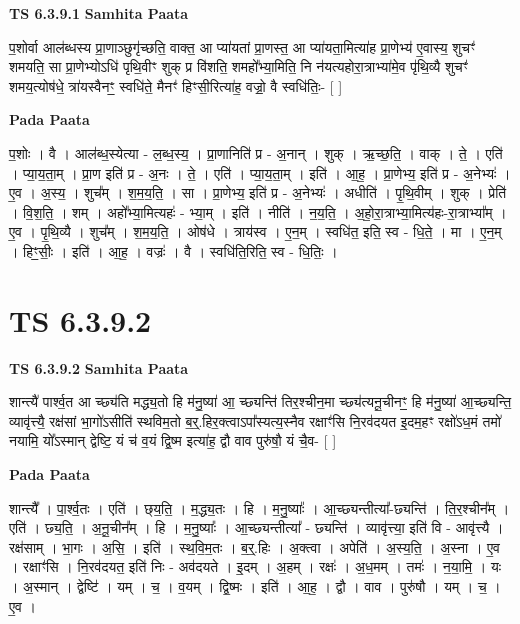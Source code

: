 \documentclass[17pt]{extarticle}
\begin{document}
\textbf{TS 6.3.9.1 } \newline
\textbf{Samhita Paata} \newline

प॒शोर्वा आल॑ब्धस्य प्रा॒णाञ्छुगृ॑च्छति॒ वाक्त॒ आ प्या॑यतां प्रा॒णस्त॒ आ प्या॑यता॒मित्या॑ह प्रा॒णेभ्य॑ ए॒वास्य॒ शुचꣳ॑ शमयति॒ सा प्रा॒णेभ्योऽधि॑ पृथि॒वीꣳ शुक् प्र वि॑शति॒ शमहो᳚भ्या॒मिति॒ नि न॑यत्यहोरा॒त्राभ्या॑मे॒व पृ॑थि॒व्यै शुचꣳ॑ शमय॒त्योष॑धे॒ त्रा॑यस्वैनꣳ॒॒ स्वधि॑ते॒ मैनꣳ॑ हिꣳसी॒रित्या॑ह॒ वज्रो॒॒ वै स्वधि॑तिः॒- [  ] \newline

\textbf{Pada Paata} \newline

प॒शोः । वै । आल॑ब्ध॒स्येत्या - ल॒ब्ध॒स्य॒ । प्रा॒णानिति॑ प्र - अ॒नान् । शुक् । ऋ॒च्छ॒ति॒ । वाक् । ते॒ । एति॑ । प्या॒य॒ता॒म् । प्रा॒ण इति॑ प्र - अ॒नः । ते॒ । एति॑ । प्या॒य॒ता॒म् । इति॑ । आ॒ह॒ । प्रा॒णेभ्य॒ इति॑ प्र - अ॒नेभ्यः॑ । ए॒व । अ॒स्य॒ । शुच᳚म् । श॒म॒य॒ति॒ । सा । प्रा॒णेभ्य॒ इति॑ प्र - अ॒नेभ्यः॑ । अधीति॑ । पृ॒थि॒वीम् । शुक् । प्रेति॑ । वि॒श॒ति॒ । शम् । अहो᳚भ्या॒मित्यहः॑ - भ्या॒म् । इति॑ । नीति॑ । न॒य॒ति॒ । अ॒हो॒रा॒त्राभ्या॒मित्य॑हः-रा॒त्राभ्या᳚म् । ए॒व । पृ॒थि॒व्यै । शुच᳚म् । श॒म॒य॒ति॒ । ओष॑धे । त्राय॑स्व । ए॒न॒म् । स्वधि॑त॒ इति॒ स्व - धि॒ते॒ । मा । ए॒न॒म् । हिꣳ॒॒सीः॒ । इति॑ । आ॒ह॒ । वज्रः॑ । वै । स्वधि॑ति॒रिति॒ स्व - धि॒तिः॒ ।  \newline




\section*{ TS 6.3.9.2 }

\textbf{TS 6.3.9.2 } \newline
\textbf{Samhita Paata} \newline

शान्त्यै॑ पार्श्व॒त आ च्छ्य॑ति मद्ध्य॒तो हि म॑नु॒ष्या॑ आ॒ च्छ्यन्ति॑ तिर॒श्चीन॒मा च्छ्य॑त्यनू॒चीनꣳ॒॒ हि म॑नु॒ष्या॑ आ॒च्छ्यन्ति॒ व्यावृ॑त्त्यै॒ रक्ष॑सां भा॒गो॑ऽसीति॑ स्थविम॒तो ब॒र्॒.हिर॒क्त्वाऽपा᳚स्यत्य॒स्नैव रक्षाꣳ॑सि नि॒रव॑दयत इ॒दम॒हꣳ रक्षो॑ऽध॒मं तमो॑ नयामि॒ यो᳚ऽस्मान् द्वेष्टि॒ यं च॑ व॒यं द्वि॒ष्म इत्या॑ह॒ द्वौ वाव पुरु॑षौ॒ यं चै॒व- [  ] \newline

\textbf{Pada Paata} \newline

शान्त्यै᳚ । पा॒र्श्व॒तः । एति॑ । छ्‌य॒ति॒ । म॒द्ध्य॒तः । हि । म॒नु॒ष्याः᳚ । आ॒च्छ्यन्तीत्या᳚-छ्यन्ति॑ । ति॒र॒श्चीन᳚म् । एति॑ । छ्य॒ति॒ । अ॒नू॒चीन᳚म् । हि । म॒नु॒ष्याः᳚ । आ॒च्छ्यन्तीत्या᳚ - छ्यन्ति॑ । व्यावृ॑त्त्या॒ इति॑ वि - आवृ॑त्त्यै । रक्ष॑साम् । भा॒गः । अ॒सि॒ । इति॑ । स्थ॒वि॒म॒तः । ब॒र्॒.हिः । अ॒क्त्वा । अपेति॑ । अ॒स्य॒ति॒ । अ॒स्ना । ए॒व । रक्षाꣳ॑सि । नि॒रव॑दयत॒ इति॑ निः - अव॑दयते । इ॒दम् । अ॒हम् । रक्षः॑ । अ॒ध॒मम् । तमः॑ । न॒या॒मि॒ । यः । अ॒स्मान् । द्वेष्टि॑ । यम् । च॒ । व॒यम् । द्वि॒ष्मः । इति॑ । आ॒ह॒ । द्वौ । वाव । पुरु॑षौ । यम् । च॒ । ए॒व ।  \newline
\end{document}
